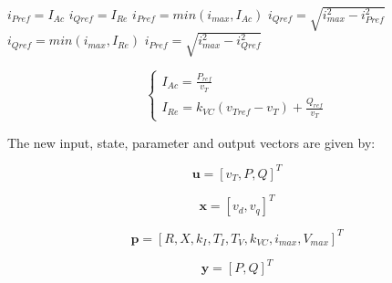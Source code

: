 \medskip

\begin{algorithmic}
		\STATE $i_{Pref} = I_{Ac}$
		\STATE $i_{Qref} = I_{Re}$
	\ELSE
			\STATE $i_{Pref} = min(i_{max}, I_{Ac})$
			\STATE $i_{Qref} = \sqrt{i_{max}^{2} - i_{Pref}^{2}}$
		\ELSE
			\STATE $i_{Qref} = min(i_{max}, I_{Re})$
			\STATE $i_{Pref} = \sqrt{i_{max}^{2} - i_{Qref}^{2}}$
		\ENDIF
	\ENDIF
\end{algorithmic}

\begin{equation*}
	\begin{cases}
		I_{Ac} = \frac{P_{ref}}{v_{T}} \\
		I_{Re} = k_{VC}(v_{Tref} - v_{T}) + \frac{Q_{ref}}{v_{T}}
	\end{cases}
\end{equation*}

The new input, state, parameter and output vectors are given by:

\begin{equation}
	\mathbf{u} = [v_{T}, P, Q]^T
	\label{eq: u_proposed}
\end{equation}

\begin{equation}
	\mathbf{x} = [v_{d}, v_{q}]^T
	\label{eq: x_proposed}
\end{equation}

\begin{equation}
	\mathbf{p} = [R, X, k_{I}, T_{I}, T_{V}, k_{VC}, i_{max}, V_{max}]^T
	\label{eq: p_proposed}
\end{equation}

\begin{equation}
	\mathbf{y} = [P, Q]^T
	\label{eq: y_proposed}
\end{equation}